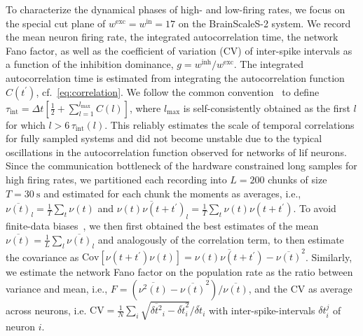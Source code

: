 To characterize the dynamical phases of high- and low-firing rates, we focus on the special cut plane of $w^\mathrm{exc}=w^\mathrm{in}=17$ on the BrainScaleS-2 system.
We record the mean neuron firing rate, the integrated autocorrelation time, the network Fano factor, as well as the coefficient of variation (CV) of inter-spike intervals as a function of the inhibition dominance, $g=w^\mathrm{inh}/w^\mathrm{exc}$.
%
The integrated autocorrelation time is estimated from integrating the autocorrelation function $C(t^\prime)$, cf.\, \cref{eq:correlation}.
We follow the common convention~\cite{grotendorst_statistical_2002} to define $\tau_\mathrm{int}=\Delta t[\frac{1}{2}+\sum_{l=1}^{l_\mathrm{max}} C(l)]$, where $l_\mathrm{max}$ is self-consistently obtained as the first $l$ for which $l > 6\,\tau_\mathrm{int}(l)$.
This reliably estimates the scale of temporal correlations for fully sampled systems and did not become unstable due to the typical oscillations in the autocorrelation function observed for networks of \gls{lif} neurons.
Since the communication bottleneck of the hardware constrained long samples for high firing rates, we partitioned each recording into $L=\num{200}$ chunks of size $T=\SI{30}{\second}$ and estimated for each chunk the moments as averages, i.e., $\overline{\nu(t)}_l=\frac{1}{T}\sum_t \nu(t)$ and $\overline{\nu(t)\nu(t+t^\prime)}_l=\frac{1}{T}\sum_t \nu(t)\nu(t+t^\prime)$.
To avoid finite-data biases~\cite{marriott_bias_1954}, we then first obtained the best estimates of the mean $\overline{\nu(t)}=\frac{1}{L}\sum_l\overline{\nu(t)}_l$ and analogously of the correlation term, to then estimate the covariance as $\text{Cov}[\nu(t+t^\prime)\nu(t)]=\overline{\nu(t)\nu(t+t^\prime)} - \overline{\nu(t)}^2$.
%
Similarly, we estimate the network Fano factor on the population rate as the ratio between variance and mean, i.e., $F=(\overline{\nu^2(t)}-\overline{\nu(t)}^2)/\overline{\nu(t)}$, and the CV as average across neurons, i.e. $\text{CV}=\frac{1}{N}\sum_i \sqrt{\overline{\delta t^2}_i-\overline{\delta t}^2_i}/\overline{\delta t}_i$ with inter-spike-intervals $\delta t_i^j$ of neuron $i$.

